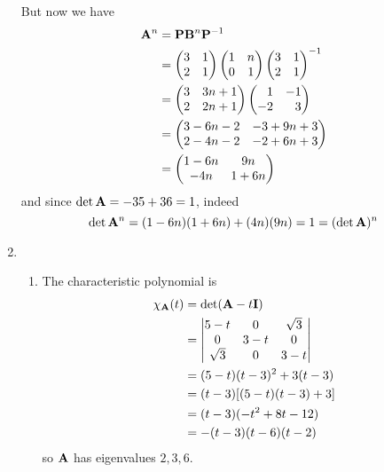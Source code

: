 \documentclass[fleqn,a4paper,11pt]{article}
\begin{document}
\begin{enumerate}[label=\textbf{\arabic*.}]
  But now we have
  \begin{align*}
   \mat A^n
   &= \mat P \mat B^n \mat P^{-1} \\
   &=
   \begin{pmatrix}
    3 & 1 \\
    2 & 1
   \end{pmatrix}
   \begin{pmatrix}
    1 & n \\
    0 & 1
   \end{pmatrix}
   \begin{pmatrix}
    3 & 1 \\
    2 & 1
   \end{pmatrix}^{-1} \\
   &=
   \begin{pmatrix}
    3 & 3n + 1 \\
    2 & 2n + 1
   \end{pmatrix}
   \begin{pmatrix*}[r]
    1 & -1 \\
    -2 & 3
   \end{pmatrix*} \\
   &=
   \begin{pmatrix}
    3 - 6n - 2 & -3 + 9n + 3 \\
    2 - 4n - 2 & -2 + 6n + 3
   \end{pmatrix} \\
   &=
   \begin{pmatrix}
    1 - 6n & 9n \\
    -4n & 1 + 6n
   \end{pmatrix}
  \end{align*}
  and since \(\det \mathbf{A} = -35 + 36 = 1\), indeed
  \begin{equation*}
   \det \mathbf{A}^n = (1 - 6n)(1 + 6n) + (4n)(9n) = 1 = (\det \mathbf{A})^n
  \end{equation*}
 \item
  \begin{enumerate}[label=(\textbf{\Alph*})]
   \item
    The characteristic polynomial is
    \begin{align*}
     \chi_{\mathbf{A}}(t)
     &= \det(\mathbf{A} - t\mathbf{I}) \\
     &=
     \begin{vmatrix}
      5 - t & 0 & \sqrt 3 \\
      0 & 3 - t & 0 \\
      \sqrt 3 & 0 & 3 - t
     \end{vmatrix} \\
     &= (5 - t)(t - 3)^2 + 3(t - 3) \\
     &= (t - 3)[(5 - t)(t - 3) + 3] \\
     &= (t - 3)(-t^2 + 8t - 12) \\
     &= -(t - 3)(t - 6)(t - 2)
    \end{align*}
    so \(\mathbf{A}\) has eigenvalues \(2, 3, 6\).


\end{enumerate}
\end{enumerate}
\end{document}
